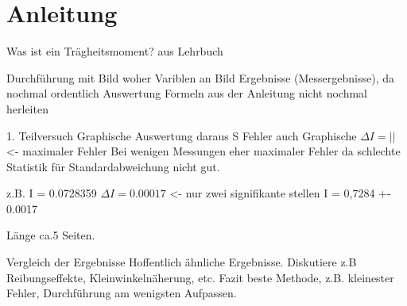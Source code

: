 
\section{Anleitung}
      Was ist ein Trägheitsmoment? aus Lehrbuch

      Durchführung mit Bild woher Variblen an Bild
      Ergebnisse (Messergebnisse), da nochmal ordentlich
      Auswertung
      Formeln aus der Anleitung nicht nochmal herleiten


      1. Teilversuch Graphische Auswertung daraus S
      Fehler auch Graphische
      \( \Delta I = \left|\right| \) <- maximaler Fehler
      Bei wenigen Messungen eher maximaler Fehler da schlechte Statistik für Standardabweichung nicht gut.


      z.B. I = 0.0728359
      \( \Delta I = 0.00017 \) <- nur zwei signifikante stellen
      I = 0,7284 +- 0.0017

      Länge ca.5 Seiten.

    Vergleich der Ergebnisse
    Hoffentlich ähnliche Ergebnisse.
    Diskutiere z.B Reibungseffekte, Kleinwinkelnäherung, etc.
    Fazit beste Methode, z.B. kleinester Fehler, Durchführung am wenigsten Aufpassen.